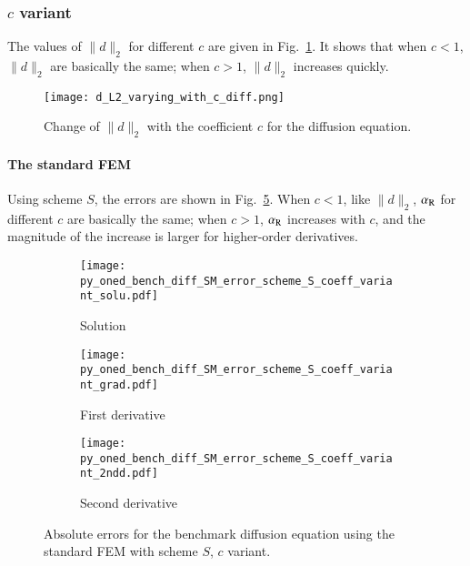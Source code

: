 \documentclass[review,3p]{elsarticle}
\begin{document}
\subsubsection{$c$ variant}

The values of $\|d\|_2$ for different $c$ are given in Fig.~\ref{Fig:d_L2_varying_with_c_diff}.
It shows that when $c<1$, $\|d\|_2$ are basically the same; when $c>1$, $\|d\|_2$ increases quickly.

\begin{figure}[!ht]
\centering
    \texttt{[image: d\_L2\_varying\_with\_c\_diff.png]}
    \caption{Change of $\|d\|_2$ with the coefficient $c$ for the diffusion equation.}
    \label{Fig:d_L2_varying_with_c_diff}   
\end{figure}

\newpage
\paragraph{The standard FEM}

Using scheme $S$, the errors are shown in Fig.~\ref{py_oned_bench_diff_SM_error_scheme_S_coeff_variant}.
When $c<1$, like $\|d\|_2$, $\alpha_{\rm R}$ for different $c$ are basically the same; when $c>1$, $\alpha_{\rm R}$ increases with $c$, and the magnitude of the increase is larger for higher-order derivatives.

\begin{figure}[!ht]
    \begin{subfigure}{5.5cm}
        \texttt{[image: py\_oned\_bench\_diff\_SM\_error\_scheme\_S\_coeff\_variant\_solu.pdf]}
        \caption{Solution}
        \label{py_oned_bench_diff_SM_error_scheme_S_coeff_variant_solu}
    \end{subfigure}
    \hspace{-0.2cm}
    \begin{subfigure}{5.5cm}
        \texttt{[image: py\_oned\_bench\_diff\_SM\_error\_scheme\_S\_coeff\_variant\_grad.pdf]}
        \caption{First derivative}
        \label{py_oned_bench_diff_SM_error_scheme_S_coeff_variant_grad}
    \end{subfigure}
    \hspace{-0.2cm}
    \begin{subfigure}{5.5cm}
        \texttt{[image: py\_oned\_bench\_diff\_SM\_error\_scheme\_S\_coeff\_variant\_2ndd.pdf]}
        \caption{Second derivative}
        \label{py_oned_bench_diff_SM_error_scheme_S_coeff_variant_2ndd}
    \end{subfigure}
\caption{Absolute errors for the benchmark diffusion equation using the standard FEM with scheme $S$, $c$ variant.}
\label{py_oned_bench_diff_SM_error_scheme_S_coeff_variant}
\end{figure}
\end{document}
